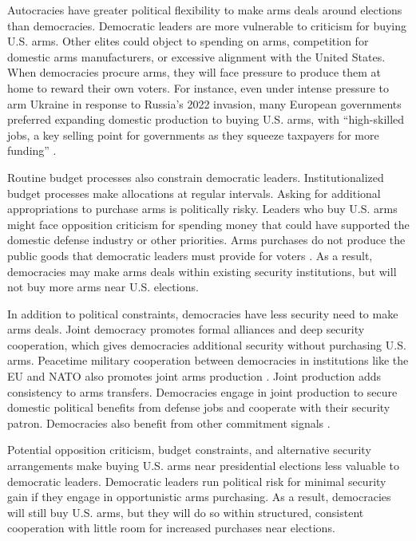 \documentclass[12pt]{article}
\begin{document}
Autocracies have greater political flexibility to make arms deals around elections than democracies. 
Democratic leaders are more vulnerable to criticism for buying U.S. arms. 
Other elites could object to spending on arms, competition for domestic arms manufacturers, or excessive alignment with the United States.
When democracies procure arms, they will face pressure to produce them at home to reward their own voters. 
For instance, even under intense pressure to arm Ukraine in response to Russia's 2022 invasion, many European governments preferred expanding domestic production to buying U.S. arms, with ``high-skilled jobs, a key selling point for governments as they squeeze taxpayers for more funding'' \citep{Meichtryetal2023}. 


Routine budget processes also constrain democratic leaders.
Institutionalized budget processes make allocations at regular intervals. 
Asking for additional appropriations to purchase arms is politically risky. 
Leaders who buy U.S. arms might face opposition criticism for spending money that could have supported the domestic defense industry or other priorities. 
Arms purchases do not produce the public goods that democratic leaders must provide for voters \citep{BDMetal2002}. 	
As a result, democracies may make arms deals within existing security institutions, but will not buy more arms near U.S. elections.


In addition to political constraints, democracies have less security need to make arms deals. 
Joint democracy promotes formal alliances and deep security cooperation, which gives democracies additional security without purchasing U.S. arms. 
Peacetime military cooperation between democracies in institutions like the EU and NATO also promotes joint arms production \citep{Klare1983, Bitzinger1994}.
Joint production adds consistency to arms transfers. 
Democracies engage in joint production to secure domestic political benefits from defense jobs and cooperate with their security patron.
Democracies also benefit from other commitment signals \citep{McManusYarhi-Milo2017}. 


Potential opposition criticism, budget constraints, and alternative security arrangements make buying U.S. arms near presidential elections less valuable to democratic leaders.
Democratic leaders run political risk for minimal security gain if they engage in opportunistic arms purchasing. 
As a result, democracies will still buy U.S. arms, but they will do so within structured, consistent cooperation with little room for increased purchases near elections. 
\end{document}

